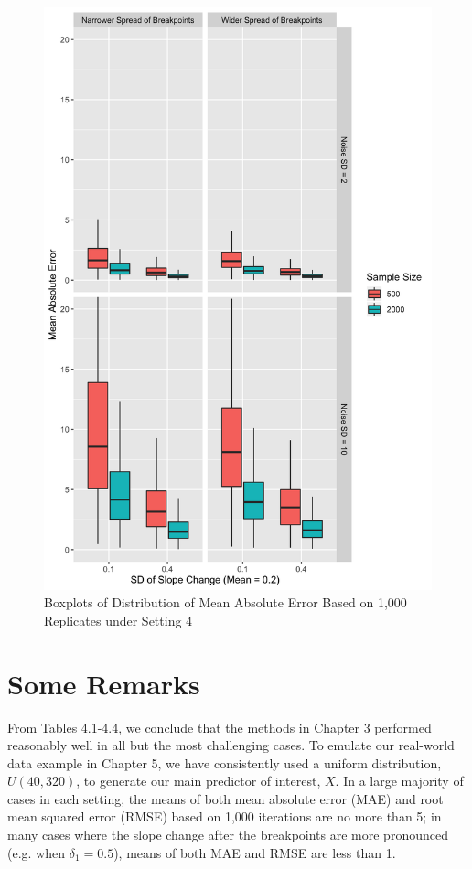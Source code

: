 \documentclass [12pt, proquest] {uwthesis}[2016/11/22]
\begin{document}
\begin{figure}
    \centering
    \includegraphics[width = 5.5 in]{Plot4_4.png}
    \caption{Boxplots of Distribution of Mean Absolute Error Based on 1,000 Replicates under Setting 4}
\end{figure}

\section{Some Remarks}
From Tables 4.1-4.4, we conclude that the methods in Chapter 3 performed reasonably well in all but the most challenging cases. To emulate our real-world data example in Chapter 5, we have consistently used a uniform distribution, $U(40, 320)$, to generate our main predictor of interest, $X$. In a large majority of cases in each setting, the means of both mean absolute error (MAE) and root mean squared error (RMSE) based on 1,000 iterations are no more than 5; in many cases where the slope change after the breakpoints are more pronounced (e.g. when $\delta_1 = 0.5$), means of both MAE and RMSE are less than 1.
\end{document}
